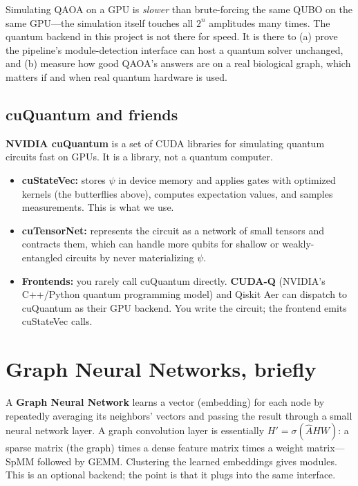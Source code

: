 \documentclass[11pt]{article}
\begin{document}
\begin{pitfall}
Simulating QAOA on a GPU is \emph{slower} than brute-forcing the same QUBO
on the same GPU---the simulation itself touches all $2^n$ amplitudes many
times. The quantum backend in this project is not there for speed. It is
there to (a) prove the pipeline's module-detection interface can host a
quantum solver unchanged, and (b) measure how good QAOA's answers are on a
real biological graph, which matters if and when real quantum hardware is
used.
\end{pitfall}

\subsection{cuQuantum and friends}

\textbf{NVIDIA cuQuantum} is a set of CUDA libraries for simulating quantum
circuits fast on GPUs. It is a library, not a quantum computer.
\begin{itemize}[nosep]
  \item \textbf{cuStateVec:} stores $\psi$ in device memory and applies gates
        with optimized kernels (the butterflies above), computes expectation
        values, and samples measurements. This is what we use.
  \item \textbf{cuTensorNet:} represents the circuit as a network of small
        tensors and contracts them, which can handle more qubits for
        shallow or weakly-entangled circuits by never materializing $\psi$.
  \item \textbf{Frontends:} you rarely call cuQuantum directly.
        \textbf{CUDA-Q} (NVIDIA's C++/Python quantum programming model) and
        Qiskit Aer can dispatch to cuQuantum as their GPU backend. You write
        the circuit; the frontend emits cuStateVec calls.
\end{itemize}

\section{Graph Neural Networks, briefly}

A \textbf{Graph Neural Network} learns a vector (embedding) for each node by
repeatedly averaging its neighbors' vectors and passing the result through a
small neural network layer. A graph convolution layer is essentially
$H' = \sigma(\hat{A} H W)$: a sparse matrix (the graph) times a dense feature
matrix times a weight matrix---SpMM followed by GEMM. Clustering the learned
embeddings gives modules. This is an optional backend; the point is that it
plugs into the same interface.
\end{document}
